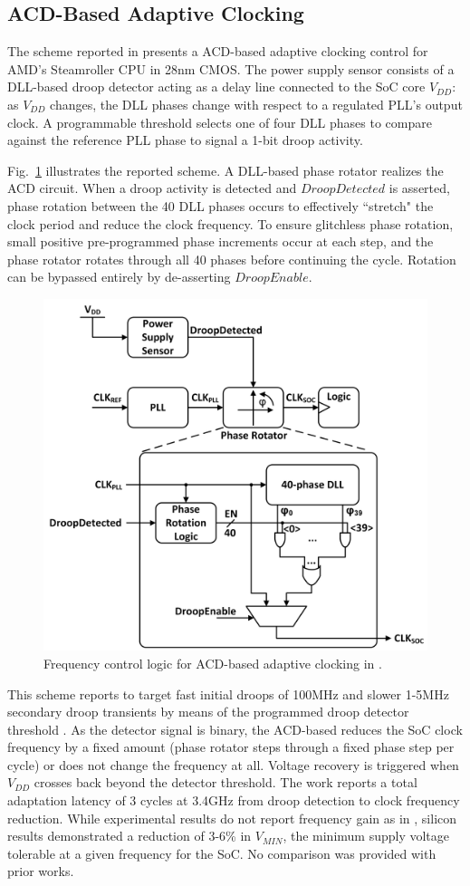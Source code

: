 \documentclass[twoside,9pt,journal,letterpage]{IEEEtran}
\begin{document}
\subsection{ACD-Based Adaptive Clocking}
\label{sec:details_acd}
The scheme reported in \cite{wilcox2015} presents a ACD-based adaptive clocking control for AMD's Steamroller CPU in 28nm CMOS. The power supply sensor consists of a DLL-based droop detector acting as a delay line connected to the SoC core $V_{DD}$: as $V_{DD}$ changes, the DLL phases change with respect to a regulated PLL's output clock. A programmable threshold selects one of four DLL phases to compare against the reference PLL phase to signal a 1-bit droop activity.

Fig.\ \ref{fig:detail_acd} illustrates the reported scheme. A DLL-based phase rotator realizes the ACD circuit. When a droop activity is detected and $DroopDetected$ is asserted, phase rotation between the 40 DLL phases occurs to effectively ``stretch" the clock period and reduce the clock frequency. To ensure glitchless phase rotation, small positive pre-programmed phase increments occur at each step, and the phase rotator rotates through all 40 phases before continuing the cycle. Rotation can be bypassed entirely by de-asserting $DroopEnable$. 


\begin{figure}[h]
	\centering
	\includegraphics[width=0.7\columnwidth]{fig_detail_acd}
	\caption{Frequency control logic for ACD-based adaptive clocking in \cite{wilcox2015}.}
	\label{fig:detail_acd}
\end{figure}

This scheme reports to target fast initial droops of 100MHz and slower 1-5MHz secondary droop transients by means of the programmed droop detector threshold \cite{wilcox2015}. As the detector signal is binary, the ACD-based reduces the SoC clock frequency by a fixed amount (phase rotator steps through a fixed phase step per cycle) or does not change the frequency at all. Voltage recovery is triggered when $V_{DD}$ crosses back beyond the detector threshold. The work reports a total adaptation latency of 3 cycles at 3.4GHz from droop detection to clock frequency reduction. While experimental results do not report frequency gain as in \cite{hashimoto2018}, silicon results demonstrated a reduction of 3-6\% in $V_{MIN}$, the minimum supply voltage tolerable at a given frequency for the SoC. No comparison was provided with prior works.
\end{document}
